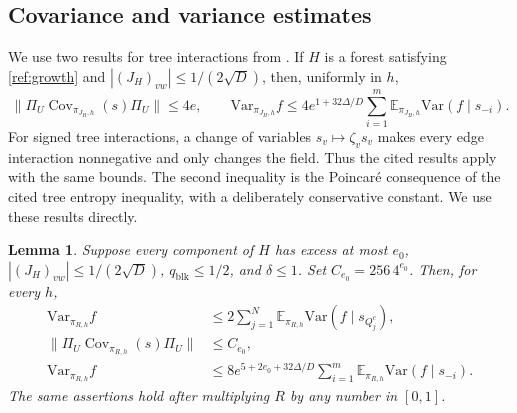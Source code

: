 \documentclass[11pt]{article}
\newcommand{\Var}{\mathrm{Var}}
\def\E{\mathbb{E}}
\newtheorem{lemma}[thm]{Lemma}
\numberwithin{equation}{section}
\begin{document}
\subsection{Covariance and variance estimates}

We use two results for tree interactions from \cite[Lemmas~4.5, 4.18--4.19 and Appendix~A.1]{LMRW24}. If $H$ is a forest satisfying \eqref{ref:growth} and $|(J_H)_{vw}|\le1/(2\sqrt D)$, then, uniformly in $h$,
\begin{equation}\label{ref:treeinputs}
 \|\Pi_U\operatorname{Cov}_{\pi_{J_H,h}}(s)\Pi_U\|\le4e,
 \qquad
 \Var_{\pi_{J_H,h}}f
 \le4e^{1+32\Delta/D}\sum_{i=1}^m
       \E_{\pi_{J_H,h}}\Var(f\mid s_{-i}).
\end{equation}
For signed tree interactions, a change of variables $s_v\mapsto\zeta_vs_v$ makes every edge interaction nonnegative and only changes the field. Thus the cited results apply with the same bounds. The second inequality is the Poincar\'e consequence of the cited tree entropy inequality, with a deliberately conservative constant. We use these results directly.

\begin{lemma}\label{ref:covariance}
Suppose every component of $H$ has excess at most $e_0$,
$|(J_H)_{vw}|\le1/(2\sqrt D)$, $q_{\mathrm{blk}}\le1/2$, and $\delta\le1$.
Set $C_{e_0}=256\,4^{e_0}$. Then, for every $h$,
\begin{align}
 \Var_{\pi_{R,h}}f&\le2\sum_{j=1}^N
               \E_{\pi_{R,h}}\Var(f\mid s_{Q_j^c}),\label{ref:blockvariance}\\
 \|\Pi_U\operatorname{Cov}_{\pi_{R,h}}(s)\Pi_U\|&\le C_{e_0},\label{ref:boundedcov}\\
 \Var_{\pi_{R,h}}f&\le8e^{5+2e_0+32\Delta/D}
             \sum_{i=1}^m\E_{\pi_{R,h}}\Var(f\mid s_{-i}).\label{ref:referencepoincare}
\end{align}
The same assertions hold after multiplying $R$ by any number in $[0,1]$.
\end{lemma}
\end{document}
